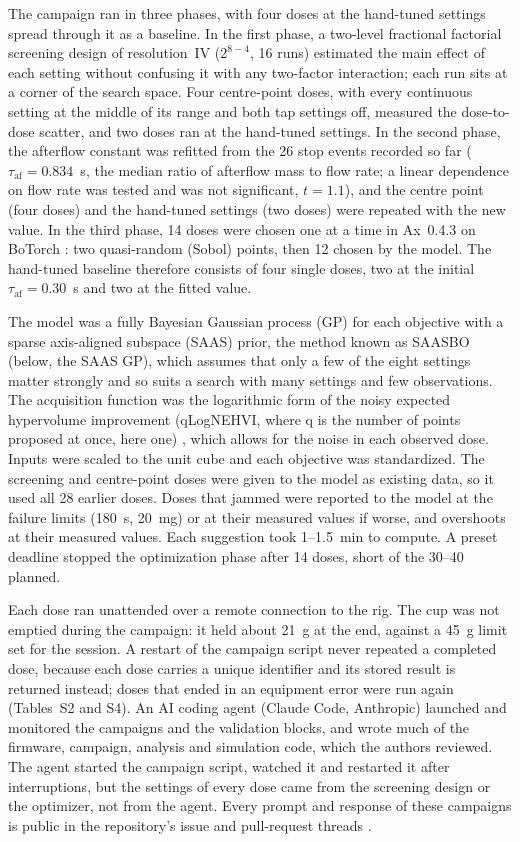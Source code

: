 \documentclass[preprint,12pt]{elsarticle}
\begin{document}
The campaign ran in three phases, with four doses at the hand-tuned settings spread through it as a baseline. In the first phase, a two-level fractional factorial screening design of resolution~IV ($2^{8-4}$, 16 runs) estimated the main effect of each setting without confusing it with any two-factor interaction; each run sits at a corner of the search space. Four centre-point doses, with every continuous setting at the middle of its range and both tap settings off, measured the dose-to-dose scatter, and two doses ran at the hand-tuned settings. In the second phase, the afterflow constant was refitted from the 26 stop events recorded so far ($\tau_\mathrm{af} = 0.834$~s, the median ratio of afterflow mass to flow rate; a linear dependence on flow rate was tested and was not significant, $t = 1.1$), and the centre point (four doses) and the hand-tuned settings (two doses) were repeated with the new value. In the third phase, 14 doses were chosen one at a time in Ax~0.4.3 \cite{AxPlatform} on BoTorch \cite{Balandat2020Botorch}: two quasi-random (Sobol) points, then 12 chosen by the model. The hand-tuned baseline therefore consists of four single doses, two at the initial $\tau_\mathrm{af} = 0.30$~s and two at the fitted value.

The model was a fully Bayesian Gaussian process (GP) for each objective with a sparse axis-aligned subspace (SAAS) prior, the method known as SAASBO \cite{Eriksson2021High} (below, the SAAS GP), which assumes that only a few of the eight settings matter strongly and so suits a search with many settings and few observations. The acquisition function was the logarithmic form of the noisy expected hypervolume improvement (qLogNEHVI, where q is the number of points proposed at once, here one) \cite{Daulton2021Parallel,Ament2023Unexpected}, which allows for the noise in each observed dose. Inputs were scaled to the unit cube and each objective was standardized. The screening and centre-point doses were given to the model as existing data, so it used all 28 earlier doses. Doses that jammed were reported to the model at the failure limits (180~s, 20~mg) or at their measured values if worse, and overshoots at their measured values. Each suggestion took 1--1.5~min to compute. A preset deadline stopped the optimization phase after 14 doses, short of the 30--40 planned.

Each dose ran unattended over a remote connection to the rig. The cup was not emptied during the campaign: it held about 21~g at the end, against a 45~g limit set for the session. A restart of the campaign script never repeated a completed dose, because each dose carries a unique identifier and its stored result is returned instead; doses that ended in an equipment error were run again (Tables~S2 and S4). An AI coding agent (Claude Code, Anthropic) launched and monitored the campaigns and the validation blocks, and wrote much of the firmware, campaign, analysis and simulation code, which the authors reviewed. The agent started the campaign script, watched it and restarted it after interruptions, but the settings of every dose came from the screening design or the optimizer, not from the agent. Every prompt and response of these campaigns is public in the repository's issue and pull-request threads \cite{PowderDoserRepo}.
\end{document}
